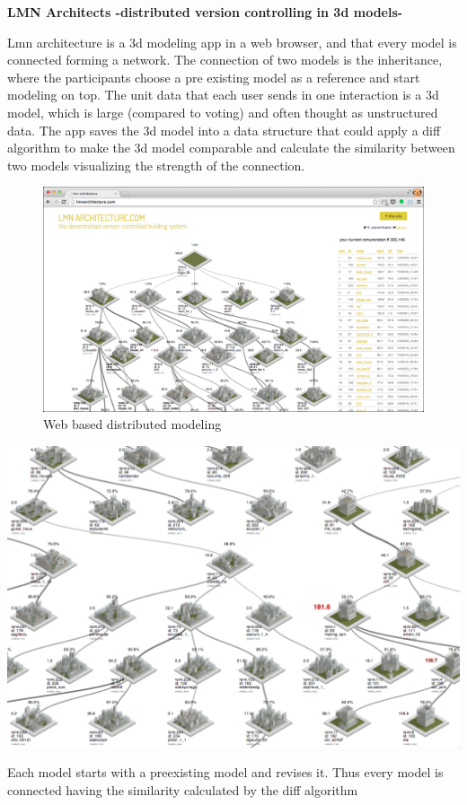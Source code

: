 \textbf{LMN Architects -distributed version controlling in 3d
models-}

Lmn architecture is a 3d modeling app in a web browser, and that every
model is connected forming a network.
The connection of two models is the inheritance, where the participants
choose a pre existing model as a reference and start modeling on top.
The unit data that each user sends in one interaction is a 3d model, which
is large (compared to voting) and often thought as unstructured data. The
app saves the 3d model into a data structure that could apply a diff
algorithm to make the 3d model comparable and calculate the similarity
between two models visualizing the strength of the connection.

\begin{figure}[htb]
  \includegraphics[width=\textwidth]{chapters/3/fig/lmn_004.png}               
  \caption[LMN:web based distributed modelling]{Web based distributed modeling}
  \label{fig:lnm}
\end{figure}

\begin{marginfigure}[{0cm}]
  \includegraphics[width=\textwidth]{chapters/3/fig/lmn_000.png}               
  \caption[LMN:net work of models]{Each model starts with a preexisting
  model and revises it. Thus every model is connected having the similarity
calculated by the diff algorithm}
  \label{fig:lnm_zoom}
\end{marginfigure}

